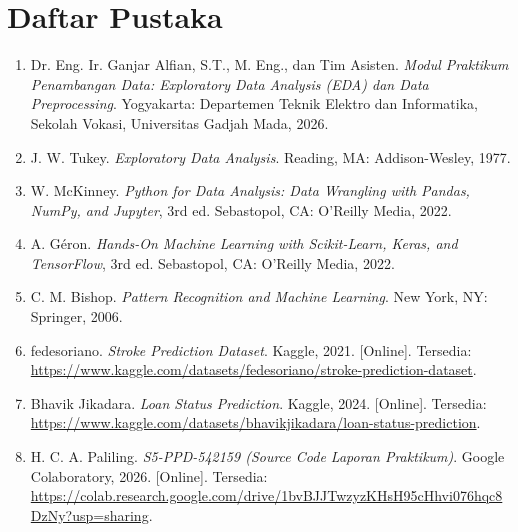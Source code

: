 \documentclass[a4paper,oneside,11pt]{book}
\begin{document}
\chapter{Daftar Pustaka}
\begin{enumerate}
    \item \label{modulPraktikum} Dr. Eng. Ir. Ganjar Alfian, S.T., M. Eng., dan Tim Asisten. \textit{Modul Praktikum Penambangan Data: Exploratory Data Analysis (EDA) dan Data Preprocessing}. Yogyakarta: Departemen Teknik Elektro dan Informatika, Sekolah Vokasi, Universitas Gadjah Mada, 2026.
    
    \item \label{tukey} J. W. Tukey. \textit{Exploratory Data Analysis}. Reading, MA: Addison-Wesley, 1977.
    
    \item \label{mckinney} W. McKinney. \textit{Python for Data Analysis: Data Wrangling with Pandas, NumPy, and Jupyter}, 3rd ed. Sebastopol, CA: O'Reilly Media, 2022.
    
    \item \label{geron} A. Géron. \textit{Hands-On Machine Learning with Scikit-Learn, Keras, and TensorFlow}, 3rd ed. Sebastopol, CA: O'Reilly Media, 2022.
    
    \item \label{bishop} C. M. Bishop. \textit{Pattern Recognition and Machine Learning}. New York, NY: Springer, 2006.
    
    \item \label{kaggleStroke} fedesoriano. \textit{Stroke Prediction Dataset}. Kaggle, 2021. [Online]. Tersedia: \url{https://www.kaggle.com/datasets/fedesoriano/stroke-prediction-dataset}.
    
    \item \label{kaggleLoan} Bhavik Jikadara. \textit{Loan Status Prediction}. Kaggle, 2024. [Online]. Tersedia: \url{https://www.kaggle.com/datasets/bhavikjikadara/loan-status-prediction}.
    
    \item \label{colabLaporan} H. C. A. Paliling. \textit{S5-PPD-542159 (Source Code Laporan Praktikum)}. Google Colaboratory, 2026. [Online]. Tersedia: \url{https://colab.research.google.com/drive/1bvBJJTwzyzKHsH95cHhvi076hqc8DzNy?usp=sharing}.
\end{enumerate}
\end{document}
